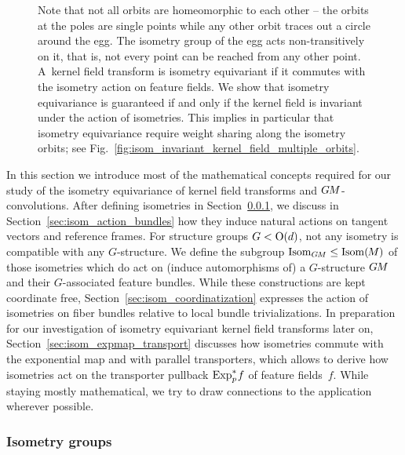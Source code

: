 \begin{figure}
{        Note that not all orbits are homeomorphic to each other -- the orbits at the poles are single points while any other orbit traces out a circle around the egg.
        The isometry group of the egg acts non-transitively on it, that is, not every point can be reached from any other point.
        A~kernel field transform is isometry equivariant if it commutes with the isometry action on feature fields.
        We show that isometry equivariance is guaranteed if and only if the kernel field is invariant under the action of isometries.
        This implies in particular that isometry equivariance require weight sharing along the isometry orbits; see Fig.~\ref{fig:isom_invariant_kernel_field_multiple_orbits}.
    }
    \label{fig:isom_egg_main}
\end{figure}


In this section we introduce most of the mathematical concepts required for our study of the isometry equivariance of kernel field transforms and $G\mkern-1.4muM$-convolutions.
After defining isometries in Section~\ref{sec:isometry_groups}, we discuss in Section~\ref{sec:isom_action_bundles} how they induce natural actions on tangent vectors and reference frames.
For structure groups $G<\operatorname{O}(d)$, not any isometry is compatible with any $G$-structure.
We define the subgroup $\operatorname{Isom}_{G\mkern-1.4muM} \leq \operatorname{Isom}(\mkern-1.5mu M \mkern-.5mu)$ of those isometries which do act on (induce automorphisms of) a $G$-structure $G\mkern-1.4muM$ and their $G$-associated feature bundles.
While these constructions are kept coordinate free, Section~\ref{sec:isom_coordinatization} expresses the action of isometries on fiber bundles relative to local bundle trivializations.
In preparation for our investigation of isometry equivariant kernel field transforms later on, Section~\ref{sec:isom_expmap_transport} discusses how isometries commute with the exponential map and with parallel transporters, which allows to derive how isometries act on the transporter pullback $\operatorname{Exp}^*_p\mkern-2mu f$ of feature fields~$f$.
While staying mostly mathematical, we try to draw connections to the application wherever possible.


\subsubsection{Isometry groups}
\label{sec:isometry_groups}

